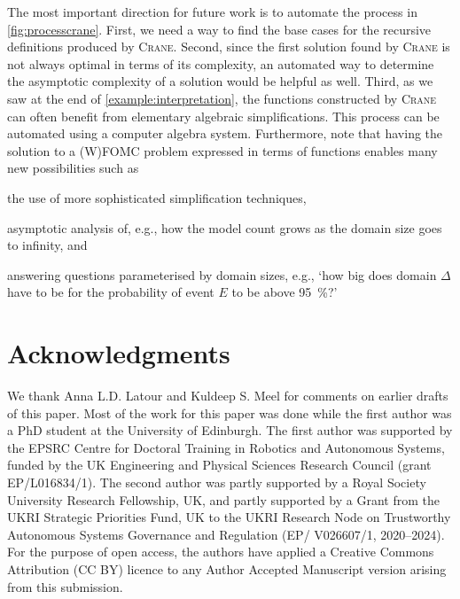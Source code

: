 \documentclass{article}
\begin{document}
The most important direction for future work is to automate the process in
\cref{fig:processcrane}. First, we need a way to find the base cases for the
recursive definitions produced by \textsc{Crane}. Second, since the first
solution found by \textsc{Crane} is not always optimal in terms of its
complexity, an automated way to determine the asymptotic complexity of a
solution would be helpful as well. Third, as we saw at the end of
\cref{example:interpretation}, the functions constructed by \textsc{Crane} can
often benefit from elementary algebraic simplifications. This process can be
automated using a computer algebra system. Furthermore, note that having the
solution to a (W)FOMC problem expressed in terms of functions enables many new
possibilities such as
\begin{enumerate*}[label=(\roman*)]
  \item the use of more sophisticated simplification techniques,
  \item asymptotic analysis of, e.g., how the model count grows as the domain
  size goes to infinity, and
  \item answering questions parameterised by domain sizes, e.g., `how big does
  domain $\Delta$ have to be for the probability of event $E$ to be above
  \SI{95}{\percent}?'
\end{enumerate*}

\section*{Acknowledgments}

We thank Anna L.D. Latour and Kuldeep S. Meel for comments on earlier drafts of
this paper. Most of the work for this paper was done while the first author was
a PhD student at the University of Edinburgh. The first author was supported by
the EPSRC Centre for Doctoral Training in Robotics and Autonomous Systems,
funded by the UK Engineering and Physical Sciences Research Council (grant
EP/L016834/1). The second author was partly supported by a Royal Society
University Research Fellowship, UK, and partly supported by a Grant from the
UKRI Strategic Priorities Fund, UK to the UKRI Research Node on Trustworthy
Autonomous Systems Governance and Regulation (EP/ V026607/1, 2020–2024). For the
purpose of open access, the authors have applied a Creative Commons Attribution
(CC BY) licence to any Author Accepted Manuscript version arising from this
submission.



\end{document}
